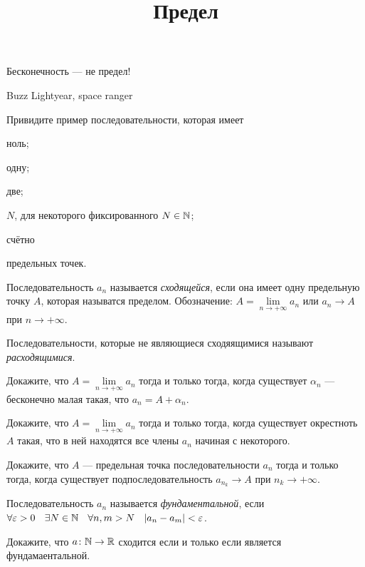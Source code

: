 \documentclass[a4paper, 12pt, num=30]{listok}
\begin{document}
\title{Предел}
\maketitle{}

\epigraph{%
    Бесконечность --- не предел!
}{%
    Buzz Lightyear, space ranger
}
\begin{problem}
    Привидите пример последовательности, которая имеет
    \begin{probparts}
        \item ноль;
        \item одну;
        \item две;
        \item $N$, для некоторого фиксированного $N \in \mathbb{N}$;
        \item счётно
    \end{probparts}
    предельных точек.
\end{problem}
\begin{definition}
    Последовательность $a_n$ называется \textit{сходящейся}, если она имеет одну предельную точку $A$, которая называтся пределом.
    Обозначение: $A = \lim\limits_{n \to +\infty} a_n$ или $a_n \to A$ при $n \to +\infty$.

    Последовательности, которые не являющиеся сходяящимися называют \textit{расходящимися}.
\end{definition}
\begin{problem}
    Докажите, что $A = \lim\limits_{n \to +\infty} a_n$ тогда и только тогда, когда существует $\alpha_n$ --- бесконечно малая такая, что $a_n = A + \alpha_n$.
\end{problem}
\begin{problem}
    Докажите, что $A = \lim\limits_{n \to +\infty} a_n$ тогда и только тогда, когда существует окрестноть $A$ такая, что в ней находятся все члены $a_n$ начиная с некоторого.
\end{problem}
\begin{problem}
    Докажите, что $A$ --- предельная точка последовательности $a_n$ тогда и только тогда, когда существует подпоследовательность $a_{n_k} \to A$ при $n_k \to +\infty$.
\end{problem}
\begin{definition}
    Последовательность $a_n$ называется \textit{фундаментальной}, если $\forall{\epsilon > 0}\exists{N \in \N}\forall{n, m > N} |a_n - a_m| < \epsilon$.
\end{definition}
\begin{problem}
    Докажите, что $a \colon \mathbb{N} \to \mathbb{R}$ сходится если и только если является фундамаентальной.
\end{problem}
\end{document}
